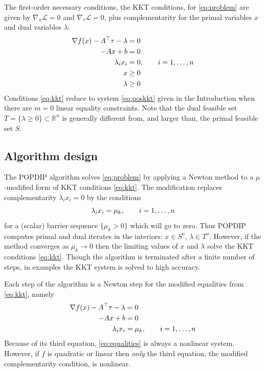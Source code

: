 \documentclass[11pt]{article}
\newcommand{\RR}{\mathbb{R}}
\newcommand{\grad}{\nabla}
\begin{document}
The first-order necessary conditions, the KKT conditions, for \eqref{eq:problem} are given by $\grad_x\mathcal{L}=0$ and $\grad_\tau\mathcal{L}=0$, plus complementarity for the primal variables $x$ and dual variables $\lambda$:
\begin{align}
\grad f(x) - A^\top \tau - \lambda &= 0 \label{eq:kkt} \\
-A x + b &= 0 \notag \\
\lambda_i x_i &=0, \qquad i=1,\dots,n \notag \\
x &\ge 0 \notag \\
\lambda &\ge 0 \notag
\end{align}
Conditions \eqref{eq:kkt} reduce to system \eqref{eq:poskkt} given in the Introduction when there are $m=0$ linear equality constraints.  Note that the dual feasible set $T=\{\lambda \ge 0\}\subset \RR^n$ is generally different from, and larger than, the primal feasible set $S$.


\subsection*{Algorithm design}

The POPDIP algorithm solves \eqref{eq:problem} by applying a Newton method to a $\mu$-modified form of KKT conditions \eqref{eq:kkt}.  The modification replaces complementarity $\lambda_i x_i = 0$ by the conditions
\begin{equation}
\lambda_i x_i = \mu_k, \qquad i=1,\dots,n \notag \\
\end{equation}
for a (scalar) barrier sequence $\{\mu_k>0\}$ which will go to zero.  Thus POPDIP computes primal and dual iterates in the interiors: $x \in S^o$, $\lambda \in T^o$.  However, if the method converges as $\mu_k \to 0$ then the limiting values of $x$ and $\lambda$ solve the KKT conditions \eqref{eq:kkt}.  Though the algorithm is terminated after a finite number of steps, in examples the KKT system is solved to high accuracy.

Each step of the algorithm is a Newton step for the modified equalities from \eqref{eq:kkt}, namely
\begin{align}
\grad f(x) - A^\top \tau - \lambda &= 0 \label{eq:equalities} \\
-A x + b &= 0 \notag \\
\lambda_i x_i &= \mu_k, \qquad i=1,\dots,n \notag
\end{align}
Because of its third equation, \eqref{eq:equalities} is always a nonlinear system.  However, if $f$ is quadratic or linear then \emph{only} the third equation, the modified complementarity condition, is nonlinear.
\end{document}
